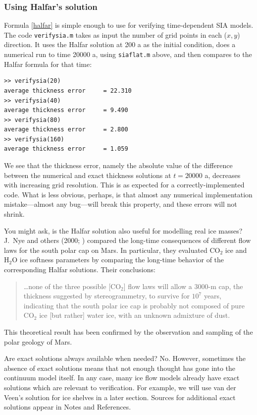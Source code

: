 \documentclass[titlepage,a4paper,final,12pt]{scrartcl}
\begin{document}
\subsubsection*{Using Halfar's solution}  Formula \eqref{halfar} is simple enough to use for verifying time-dependent SIA models.  The code \texttt{verifysia.m} takes as input the number of grid points in each ($x,y$) direction.  It uses the Halfar solution at 200 a as the initial condition, does a numerical run to time 20000 a, using \texttt{siaflat.m} above, and then compares to the Halfar formula for that time:
\small
\begin{verbatim}
>> verifysia(20)
average thickness error     = 22.310
>> verifysia(40)
average thickness error     = 9.490
>> verifysia(80)
average thickness error     = 2.800
>> verifysia(160)
average thickness error     = 1.059
\end{verbatim}
\normalsize
We see that the thickness error, namely the absolute value of the difference between the numerical and exact thickness solutions at $t=20000$ a, decreases with increasing grid resolution.  This is as expected for a correctly-implemented code.  What is less obvious, perhaps, is that almost any numerical implementation mistake---almost any bug---will break this property, and these errors will not shrink.

You might ask, is the Halfar solution also useful for modelling real ice masses?  J.~Nye and others (2000; \cite{NyeIcarus2000}) compared the long-time consequences of different flow laws for the south polar cap on Mars.  In particular, they evaluated $\text{CO}_2$ ice and $\text{H}_2\text{O}$ ice softness parameters by comparing the long-time behavior of the corresponding Halfar solutions.  Their conclusions:
  \begin{quote}
  \dots none of the three possible [$\text{CO}_2$] flow laws will allow a 3000-m cap, the thickness suggested by stereogrammetry, to survive for $10^7$ years, indicating that the south polar ice cap is probably not composed of pure $\text{CO}_2$ ice [but rather] water ice, with an unknown admixture of dust.
  \end{quote}
This theoretical result has been confirmed by the observation and sampling of the polar geology of Mars.

Are exact solutions always available when needed?  No.  However, sometimes the absence of exact solutions means that not enough thought has gone into the continuum model itself.  In any case, many ice flow models already have exact solutions which are relevant to verification.  For example, we will use van der Veen's solution for ice shelves in a later section.  Sources for additional exact solutions appear in Notes and References.
\end{document}
